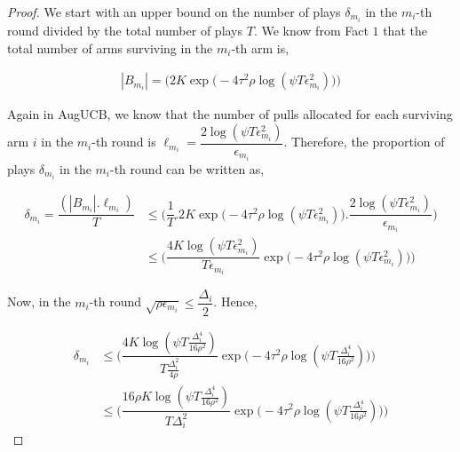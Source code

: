 \begin{proof}
We start with an upper bound on the number of plays $\delta_{m_{i}}$ in the $m_{i}$-th round divided by the total number of plays $T$. We know  from Fact $1$  that the total number of arms surviving in the $m_{i}$-th arm is, 

\begin{align*}
|B_{m_{i}}|=\bigg(2K\exp\big(-4\tau^{2}\rho\log (\psi T\epsilon_{m_{i}}^{2})\big)\bigg) 
\end{align*}     

Again in AugUCB, we know that the number of pulls allocated for each surviving arm $i$ in the $m_{i}$-th round is $\ell_{m_{i}}=\dfrac{2\log (\psi T \epsilon_{m_{i}}^{2})}{\epsilon_{m_{i}}}$. Therefore, the proportion of plays $\delta_{m_{i}}$ in the $m_{i}$-th round can be written as,

\begin{align*}
\delta_{m_{i}}=\dfrac{(|B_{m_{i}}|.\ell_{m_{i}})}{T} &\leq \bigg(\dfrac{1}{T}.2K\exp\big(-4\tau^{2}\rho\log (\psi T\epsilon_{m_{i}}^{2})\big).\dfrac{2\log (\psi T \epsilon_{m_{i}}^{2})}{\epsilon_{m_{i}}}\bigg)\\
& \leq \bigg(\dfrac{4K\log (\psi T \epsilon_{m_{i}}^{2})}{T\epsilon_{m_{i}}}\exp\big(-4\tau^{2}\rho\log (\psi T\epsilon_{m_{i}}^{2})\big)\bigg)
\end{align*}

Now, in the $m_{i}$-th round $\sqrt{\rho\epsilon_{m_{i}}}\leq \dfrac{\Delta_{i}}{2}$. Hence,

\begin{align*}
\delta_{m_{i}}& \leq \bigg(\dfrac{4K\log (\psi T \frac{\Delta_{i}^{4}}{16\rho^{2}})}{T\frac{\Delta_{i}^{2}}{4\rho}}\exp\big(-4\tau^{2}\rho\log (\psi T\frac{\Delta_{i}^{4}}{16\rho^{2}})\big)\bigg)\\
&\leq \bigg(\dfrac{16\rho K\log (\psi T \frac{\Delta_{i}^{4}}{16\rho^{2}})}{T\Delta_{i}^{2}}\exp\big(-4\tau^{2}\rho\log (\psi T\frac{\Delta_{i}^{4}}{16\rho^{2}})\big)\bigg)
\end{align*}

%


\end{proof}
